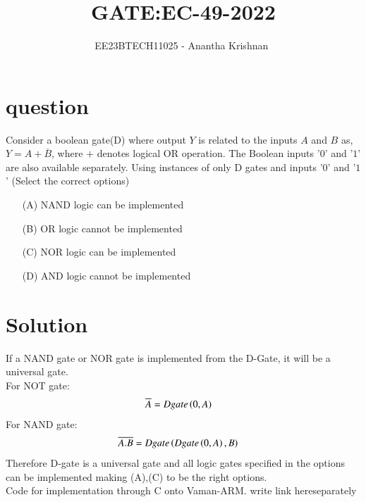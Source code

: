 \documentclass[journal,12pt,onecolumn]{IEEEtran}
\theoremstyle{remark}
\begin{document}

\vspace{3cm}

\title{GATE:EC-49-2022}
\author{EE23BTECH11025 - Anantha Krishnan $^{}$%
}
\maketitle
\bigskip



\section{question}
Consider a boolean gate(D) where output $Y$ is related to the inputs $A$ and $B$ as, $Y = A + \overline{B}$, where $+$ denotes logical OR operation. The Boolean inputs '$0$' and '$1$' are also available separately. Using instances of only D gates and inputs '$0$' and '$1$' (Select the correct options)
\begin{enumerate}
    \item [(A)] NAND logic can be implemented
    \item [(B)] OR logic cannot be implemented 
    \item [(C)] NOR logic can be implemented
    \item [(D)] AND logic cannot be implemented
\end{enumerate}

\section{Solution}
If a NAND gate or NOR gate is implemented from the D-Gate, it will be a universal gate.\\
For NOT gate:
\begin{align}
    \overline{A} &= Dgate\left(0,A\right)
\end{align}
For NAND gate:
\begin{align}
    \overline{A.B} &= Dgate\left(Dgate\left(0,A\right),B\right)
\end{align}
Therefore D-gate is a universal gate and all logic gates specified in the options can be implemented making (A),(C) to be the right options.\\
Code for implementation through C onto Vaman-ARM.
write link hereseparately
 
\end{document}

